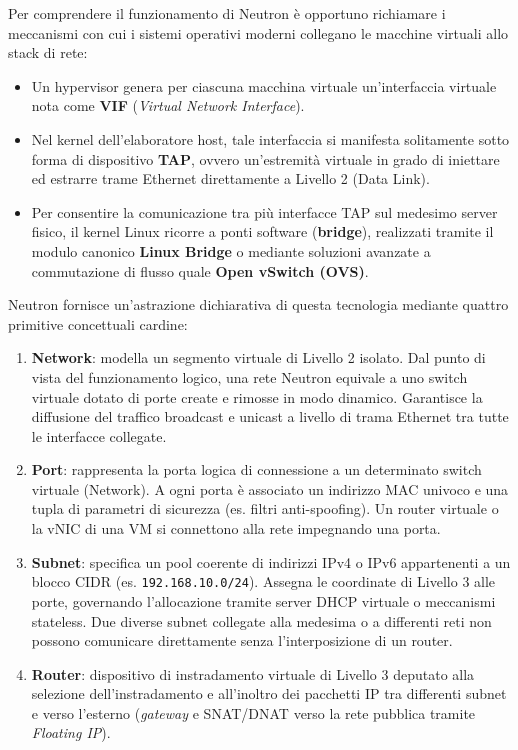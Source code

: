 \documentclass[11pt, a4paper]{article}
\begin{document}
Per comprendere il funzionamento di Neutron è opportuno richiamare i meccanismi con cui i sistemi operativi moderni collegano le macchine virtuali allo stack di rete:
\begin{itemize}[leftmargin=*]
    \item Un hypervisor genera per ciascuna macchina virtuale un'interfaccia virtuale nota come \textbf{VIF} (\emph{Virtual Network Interface}).
    \item Nel kernel dell'elaboratore host, tale interfaccia si manifesta solitamente sotto forma di dispositivo \textbf{TAP}, ovvero un'estremità virtuale in grado di iniettare ed estrarre trame Ethernet direttamente a Livello 2 (Data Link).
    \item Per consentire la comunicazione tra più interfacce TAP sul medesimo server fisico, il kernel Linux ricorre a ponti software (\textbf{bridge}), realizzati tramite il modulo canonico \textbf{Linux Bridge} o mediante soluzioni avanzate a commutazione di flusso quale \textbf{Open vSwitch (OVS)}.
\end{itemize}


Neutron fornisce un'astrazione dichiarativa di questa tecnologia mediante quattro primitive concettuali cardine:
\begin{enumerate}[leftmargin=*]
    \item \textbf{Network}: modella un segmento virtuale di Livello 2 isolato. Dal punto di vista del funzionamento logico, una rete Neutron equivale a uno switch virtuale dotato di porte create e rimosse in modo dinamico. Garantisce la diffusione del traffico broadcast e unicast a livello di trama Ethernet tra tutte le interfacce collegate.
    \item \textbf{Port}: rappresenta la porta logica di connessione a un determinato switch virtuale (Network). A ogni porta è associato un indirizzo MAC univoco e una tupla di parametri di sicurezza (es. filtri anti-spoofing). Un router virtuale o la vNIC di una VM si connettono alla rete impegnando una porta.
    \item \textbf{Subnet}: specifica un pool coerente di indirizzi IPv4 o IPv6 appartenenti a un blocco CIDR (es. \texttt{192.168.10.0/24}). Assegna le coordinate di Livello 3 alle porte, governando l'allocazione tramite server DHCP virtuale o meccanismi stateless. Due diverse subnet collegate alla medesima o a differenti reti non possono comunicare direttamente senza l'interposizione di un router.
    \item \textbf{Router}: dispositivo di instradamento virtuale di Livello 3 deputato alla selezione dell'instradamento e all'inoltro dei pacchetti IP tra differenti subnet e verso l'esterno (\emph{gateway} e SNAT/DNAT verso la rete pubblica tramite \emph{Floating IP}).
\end{enumerate}
\end{document}
